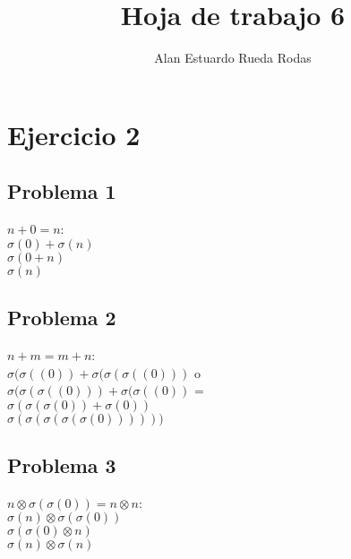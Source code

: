 \documentclass[8pt, a4paper]{article} %
\author{Alan Estuardo Rueda Rodas} %
\begin{document}
  \title{Hoja de trabajo 6} %
   \maketitle %
    
    \section{Ejercicio 2} %
    \subsection{Problema 1} %
      $n+0=n$:\\
            $\sigma(0) + \sigma(n)$\\
            $\sigma (0 + n)$\\
            $\sigma(n)$
    \subsection{Problema 2}
      $n+m = m+n$:\\
            $\sigma(\sigma((0)) + \sigma(\sigma(\sigma((0)))$ o \\
            $\sigma(\sigma(\sigma((0))) + \sigma(\sigma((0))$ =\\
            $\sigma (\sigma(\sigma(0)) + \sigma(0))$\\
            $\sigma(\sigma(\sigma(\sigma(\sigma(0))))))$
    \subsection{Problema 3}
       $n \otimes \sigma(\sigma(0)) = n \otimes n$:\\
            $\sigma(n) \otimes \sigma(\sigma(0))$\\
            $\sigma (\sigma(0) \otimes n)$\\
            $\sigma(n) \otimes \sigma(n)$
    
\end{document}
